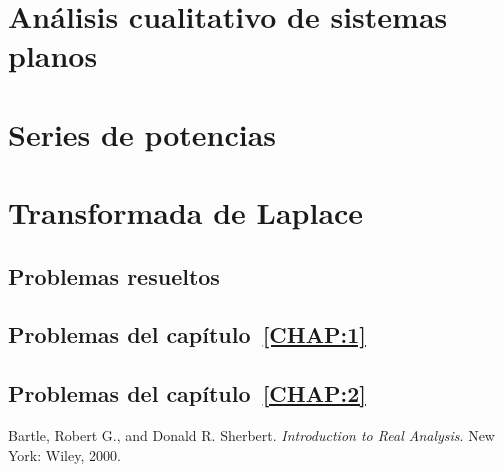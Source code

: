\documentclass[a4paper, 10pt, openany]{book}
\begin{document}
\chapter{Análisis cualitativo de sistemas planos}
\label{CHAP:4}


\chapter{Series de potencias}
\label{CHAP:5}


\chapter{Transformada de Laplace}
\label{CHAP:6}


\begin{appendices}

\chapter{Problemas resueltos}

\section{Problemas del capítulo~\ref{CHAP:1}}


\section{Problemas del capítulo~\ref{CHAP:2}}


\end{appendices}

\backmatter

\listoffigures
{}

\listoftables
{}

\begin{thebibliography}{1}
Bartle, Robert G., and Donald R. Sherbert.
\textit{Introduction to Real Analysis}. 
New York: Wiley, 2000. 
\end{thebibliography}
\end{document}
